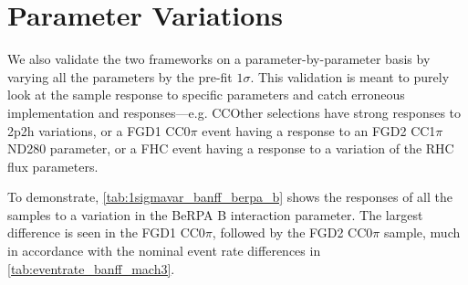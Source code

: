 \section{Parameter Variations}
We also validate the two frameworks on a parameter-by-parameter basis by varying all the parameters by the pre-fit $1\sigma$. This validation is meant to purely look at the sample response to specific parameters and catch erroneous implementation and \pmu \cosmu responses---e.g. CCOther selections have strong responses to 2p2h variations, or a FGD1 CC0$\pi$ event having a response to an FGD2 CC1$\pi$ ND280 parameter, or a FHC \numu event having a response to a variation of the RHC flux parameters.

To demonstrate, \autoref{tab:1sigmavar_banff_berpa_b} shows the responses of all the samples to a variation in the BeRPA B interaction parameter. The largest difference is seen in the FGD1 CC0$\pi$, followed by the FGD2 CC0$\pi$ sample, much in accordance with the nominal event rate differences in \autoref{tab:eventrate_banff_mach3}.
